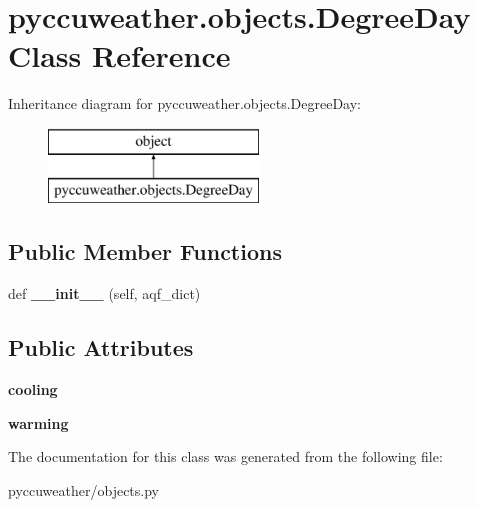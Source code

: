 \hypertarget{classpyccuweather_1_1objects_1_1_degree_day}{}\section{pyccuweather.\+objects.\+Degree\+Day Class Reference}
\label{classpyccuweather_1_1objects_1_1_degree_day}
Inheritance diagram for pyccuweather.\+objects.\+Degree\+Day\+:\begin{figure}[H]
\begin{center}
\leavevmode
\includegraphics[height=2.000000cm]{classpyccuweather_1_1objects_1_1_degree_day}
\end{center}
\end{figure}
\subsection*{Public Member Functions}
\begin{DoxyCompactItemize}
\item 
\hypertarget{classpyccuweather_1_1objects_1_1_degree_day_aa2ed6f5e809e02d62930362936f8a1e1}{}def {\bfseries \+\_\+\+\_\+init\+\_\+\+\_\+} (self, aqf\+\_\+dict)\label{classpyccuweather_1_1objects_1_1_degree_day_aa2ed6f5e809e02d62930362936f8a1e1}

\end{DoxyCompactItemize}
\subsection*{Public Attributes}
\begin{DoxyCompactItemize}
\item 
\hypertarget{classpyccuweather_1_1objects_1_1_degree_day_a8ca968ca5dc856235a9c5e3f1fdc9b1b}{}{\bfseries cooling}\label{classpyccuweather_1_1objects_1_1_degree_day_a8ca968ca5dc856235a9c5e3f1fdc9b1b}

\item 
\hypertarget{classpyccuweather_1_1objects_1_1_degree_day_a3aeb2a2c2a4e1c95688c95ab7c383b58}{}{\bfseries warming}\label{classpyccuweather_1_1objects_1_1_degree_day_a3aeb2a2c2a4e1c95688c95ab7c383b58}

\end{DoxyCompactItemize}


The documentation for this class was generated from the following file\+:\begin{DoxyCompactItemize}
\item 
pyccuweather/objects.\+py\end{DoxyCompactItemize}
